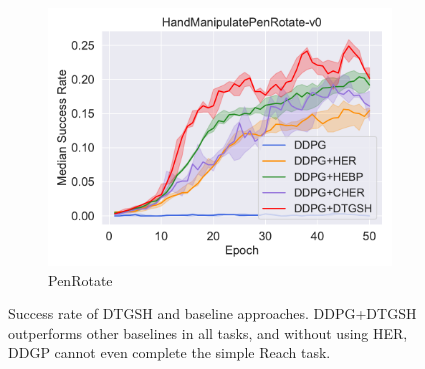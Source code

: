 \begin{figure}[H]
\begin{subfigure}[t]{0.49\textwidth}
    \includegraphics[width=\textwidth]{figures/chapter4/HandManipulatePenRotate-v0.pdf}
    \caption{PenRotate}
    \label{subfig:baseline_handpen}
  \end{subfigure}\hfill
  \caption[Results of DTGSH in the robotic manipulation environment.]{Success rate of DTGSH and baseline approaches. DDPG+DTGSH outperforms other baselines in all tasks, and without using HER, DDGP cannot even complete the simple Reach task.}
  \label{fig:baseline_compare_c4}
\end{figure}

